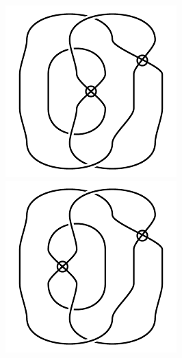 \begin{figure}[H]
\begin{minipage}[b]{.18\linewidth}
\end{minipage}
\begin{minipage}[b]{.18\linewidth}
\centering
\includegraphics[width=\linewidth]{../data/virtual_4_4.png}
\end{minipage}
\begin{minipage}[b]{.18\linewidth}
\centering
\includegraphics[width=\linewidth]{../data/virtual_4_5.png}

\end{minipage}
\end{figure}
